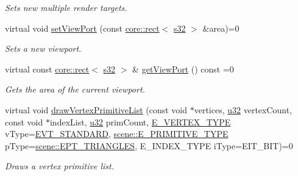\begin{DoxyCompactItemize}
\begin{DoxyCompactList}\small\item\em Sets new multiple render targets. \end{DoxyCompactList}\item 
virtual void \hyperlink{classirr_1_1video_1_1IVideoDriver_af03cf9b67bb7b43a8021bbe4baa78a08}{set\+View\+Port} (const \hyperlink{classirr_1_1core_1_1rect}{core\+::rect}$<$ \hyperlink{namespaceirr_ac66849b7a6ed16e30ebede579f9b47c6}{s32} $>$ \&area)=0
\begin{DoxyCompactList}\small\item\em Sets a new viewport. \end{DoxyCompactList}\item 
virtual const \hyperlink{classirr_1_1core_1_1rect}{core\+::rect}$<$ \hyperlink{namespaceirr_ac66849b7a6ed16e30ebede579f9b47c6}{s32} $>$ \& \hyperlink{classirr_1_1video_1_1IVideoDriver_aa21810374736559e937fcad30ac699b4}{get\+View\+Port} () const =0
\begin{DoxyCompactList}\small\item\em Gets the area of the current viewport. \end{DoxyCompactList}\item 
virtual void \hyperlink{classirr_1_1video_1_1IVideoDriver_ab18ac3ba8b6dbaa4437c5eb3b1e2f4fb}{draw\+Vertex\+Primitive\+List} (const void $\ast$vertices, \hyperlink{namespaceirr_a0416a53257075833e7002efd0a18e804}{u32} vertex\+Count, const void $\ast$index\+List, \hyperlink{namespaceirr_a0416a53257075833e7002efd0a18e804}{u32} prim\+Count, \hyperlink{namespaceirr_1_1video_a0e3b59e025e0d0db0ed2ee0ce904deac}{E\+\_\+\+V\+E\+R\+T\+E\+X\+\_\+\+T\+Y\+PE} v\+Type=\hyperlink{namespaceirr_1_1video_a0e3b59e025e0d0db0ed2ee0ce904deaca921f287a4f48d612a5be2d89453ca262}{E\+V\+T\+\_\+\+S\+T\+A\+N\+D\+A\+RD}, \hyperlink{namespaceirr_1_1scene_a5d7de82f2169761194b2f44d95cdc1dc}{scene\+::\+E\+\_\+\+P\+R\+I\+M\+I\+T\+I\+V\+E\+\_\+\+T\+Y\+PE} p\+Type=\hyperlink{namespaceirr_1_1scene_a5d7de82f2169761194b2f44d95cdc1dca6c884c4de3210b3ed36c99fb828ce376}{scene\+::\+E\+P\+T\+\_\+\+T\+R\+I\+A\+N\+G\+L\+ES}, E\+\_\+\+I\+N\+D\+E\+X\+\_\+\+T\+Y\+PE i\+Type=E\+I\+T\+\_\+B\+IT)=0
\begin{DoxyCompactList}\small\item\em Draws a vertex primitive list. \end{DoxyCompactList}\item 

\end{DoxyCompactItemize}
